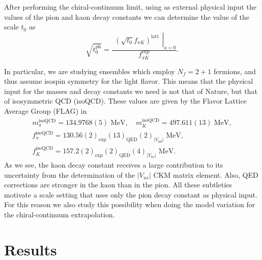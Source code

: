 After performing the chiral-continuum limit, using as external physical input the values of the pion and kaon decay constants we can determine the value of the scale $t_0$ as
\begin{equation}
\sqrt{t_0^{\textrm{ph}}}=\frac{\left.\begin{matrix}
\left(\sqrt{t_0}f_{\pi K}\right)^{\textrm{latt}}
\end{matrix}\right|_{a=0}}{f_{\pi K}^{\textrm{exp}}}.
\end{equation}

In particular, we are studying ensembles which employ $N_f=2+1$ fermions, and thus assume isospin symmetry for the light flavor. This means that the physical input for the masses and decay constants we need is not that of Nature, but that of isosymmetric QCD (isoQCD). These values are given by the Flavor Lattice Average Group (FLAG) in~\cite{FLAG21}
\begin{gather}
\label{ch_ss:eq:isoQCD}
m_{\pi}^{\textrm{isoQCD}}=134.9768(5)\;{\textrm{MeV}}, \quad
m_{K}^{\textrm{isoQCD}}=497.611(13)\;{\textrm{MeV}}, \\
f_{\pi}^{\textrm{isoQCD}}=130.56(2)_{\textrm{exp}}(13)_{\textrm{QED}}(2)_{|V_{ud}|}\;{\textrm{MeV}}, \quad \\
f_{K}^{\textrm{isoQCD}}=157.2(2)_{\textrm{exp}}(2)_{\textrm{QED}}(4)_{|V_{us}|}\;{\textrm{MeV}}.
\end{gather} 
As we see, the kaon decay constant receives a large contribution to its uncertainty from the determination of the $|V_{us}|$ CKM matrix element. Also, QED corrections are stronger in the kaon than in the pion. All these subtleties motivate a scale setting that uses only the pion decay constant as physical input. For this reason we also study this possibility when doing the model variation for the chiral-continuum extrapolation.



\section{Results}
\label{ch_ss:sec:Results}

